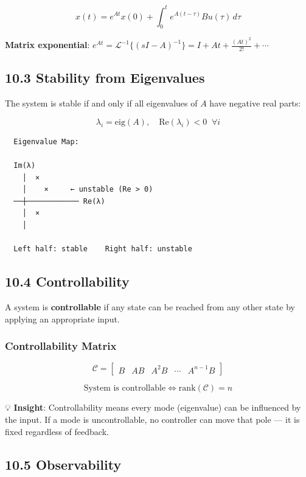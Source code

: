 \documentclass[11pt,a4paper]{book}
\begin{document}
\[x(t) = e^{At}x(0) + \int_0^t e^{A(t-\tau)}Bu(\tau) \, d\tau\]

\textbf{Matrix exponential}: $e^{At} = \mathcal{L}^{-1}\{(sI-A)^{-1}\} = I + At + \frac{(At)^2}{2!} + \cdots$

\medskip\noindent\hrulefill\medskip

\subsection{10.3 Stability from Eigenvalues}

The system is stable if and only if all eigenvalues of $A$ have negative real parts:

\[\lambda_i = \text{eig}(A), \quad \text{Re}(\lambda_i) < 0 \;\; \forall i\]

\begin{lstlisting}
  Eigenvalue Map:
  
  Im(λ)
    │  ×       
    │    ×     ← unstable (Re > 0)
  ──┼──────────── Re(λ)
    │  ×       
    │    
    
  Left half: stable    Right half: unstable
\end{lstlisting}

\medskip\noindent\hrulefill\medskip

\subsection{10.4 Controllability}

A system is \textbf{controllable} if any state can be reached from any other state by applying an appropriate input.

\subsubsection{Controllability Matrix}

\[\mathcal{C} = \begin{bmatrix} B & AB & A^2B & \cdots & A^{n-1}B \end{bmatrix}\]

\[\boxed{\text{System is controllable} \iff \text{rank}(\mathcal{C}) = n}\]

💡 \textbf{Insight}: Controllability means every mode (eigenvalue) can be influenced by the input. If a mode is uncontrollable, no controller can move that pole — it is fixed regardless of feedback.

\medskip\noindent\hrulefill\medskip

\subsection{10.5 Observability}
\end{document}
